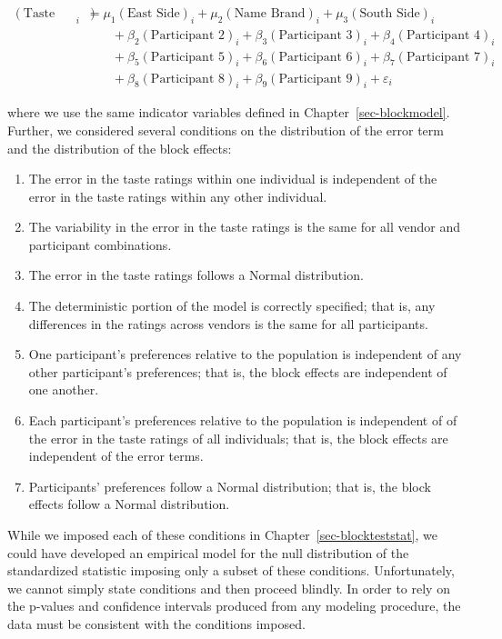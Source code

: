 \documentclass[
  letterpaper,
  DIV=11,
  numbers=noendperiod]{scrreprt}
\providecommand{\tightlist}{%
  \setlength{\itemsep}{0pt}\setlength{\parskip}{0pt}}\usepackage{longtable,booktabs,array}
\theoremstyle{plain}
\theoremstyle{definition}
\theoremstyle{definition}
\theoremstyle{remark}
\begin{document}
\[
\begin{aligned}
  (\text{Taste Rating})_i &= \mu_1 (\text{East Side})_i + \mu_2 (\text{Name Brand})_i + \mu_3 (\text{South Side})_i \\
    &\qquad + \beta_2 (\text{Participant 2})_i + \beta_3 (\text{Participant 3})_i + \beta_4 (\text{Participant 4})_i \\
    &\qquad + \beta_5 (\text{Participant 5})_i + \beta_6 (\text{Participant 6})_i + \beta_7 (\text{Participant 7})_i \\
    &\qquad + \beta_8 (\text{Participant 8})_i + \beta_9 (\text{Participant 9})_i + \varepsilon_i
\end{aligned}
\]

where we use the same indicator variables defined in
Chapter~\ref{sec-blockmodel}. Further, we considered several conditions
on the distribution of the error term and the distribution of the block
effects:

\begin{enumerate}
\def\labelenumi{\arabic{enumi}.}
\tightlist
\item
  The error in the taste ratings within one individual is independent of
  the error in the taste ratings within any other individual.
\item
  The variability in the error in the taste ratings is the same for all
  vendor and participant combinations.
\item
  The error in the taste ratings follows a Normal distribution.
\item
  The deterministic portion of the model is correctly specified; that
  is, any differences in the ratings across vendors is the same for all
  participants.
\item
  One participant's preferences relative to the population is
  independent of any other participant's preferences; that is, the block
  effects are independent of one another.
\item
  Each participant's preferences relative to the population is
  independent of of the error in the taste ratings of all individuals;
  that is, the block effects are independent of the error terms.
\item
  Participants' preferences follow a Normal distribution; that is, the
  block effects follow a Normal distribution.
\end{enumerate}

While we imposed each of these conditions in
Chapter~\ref{sec-blockteststat}, we could have developed an empirical
model for the null distribution of the standardized statistic imposing
only a subset of these conditions. Unfortunately, we cannot simply state
conditions and then proceed blindly. In order to rely on the p-values
and confidence intervals produced from any modeling procedure, the data
must be consistent with the conditions imposed.
\end{document}
